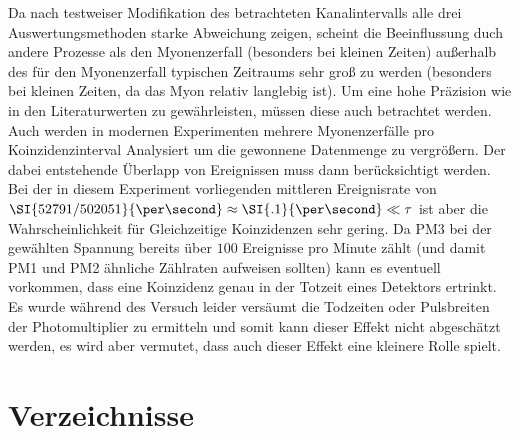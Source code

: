 \documentclass[slug=LM, room=Andreas-Schubert-Bau\,\ K\ 1A, supervisor=Anne-Sophie\ Berthold, coursedate=13.\ 12.\ 2019]{../../Lab_Report_LaTeX/lab_report}
\begin{document}
Da nach testweiser Modifikation des betrachteten Kanalintervalls alle
drei Auswertungsmethoden starke Abweichung zeigen, scheint die
Beeinflussung duch andere Prozesse als den Myonenzerfall (besonders
bei kleinen Zeiten) außerhalb des f\"ur den Myonenzerfall typischen
Zeitraums sehr gro\ss{} zu werden (besonders bei kleinen Zeiten, da das
Myon relativ langlebig ist).  Um eine hohe Pr\"azision wie in den
Literaturwerten zu gew\"ahrleisten, m\"ussen diese auch betrachtet
werden. Auch werden in modernen Experimenten mehrere Myonenzerf\"alle
pro Koinzidenzinterval Analysiert um die gewonnene Datenmenge zu
vergr\"o\ss{}ern. Der dabei entstehende \"Uberlapp von Ereignissen
muss dann ber\"ucksichtigt werden.~\cite{fast} Bei der in diesem
Experiment vorliegenden mittleren Ereignisrate von
\(\SI{52791/502051}{\per\second} \approx \SI{.1}{\per\second}\ll\tau\)
ist aber die Wahrscheinlichkeit f\"ur Gleichzeitige Koinzidenzen sehr
gering. Da PM3 bei der gew\"ahlten Spannung bereits \"uber \(100\)
Ereignisse pro Minute z\"ahlt (und damit PM1 und PM2 \"ahnliche
Z\"ahlraten aufweisen sollten) kann es eventuell vorkommen, dass eine
Koinzidenz genau in der Totzeit eines Detektors ertrinkt. Es wurde
w\"ahrend des Versuch leider vers\"aumt die Todzeiten oder Pulsbreiten
der Photomultiplier zu ermitteln und somit kann dieser Effekt nicht
abgesch\"atzt werden, es wird aber vermutet, dass auch dieser Effekt
eine kleinere Rolle spielt.

\newpage
\section{Verzeichnisse}
\label{sec:literatur}

\listoffigures

\listoftables

\printbibliography
\end{document}
